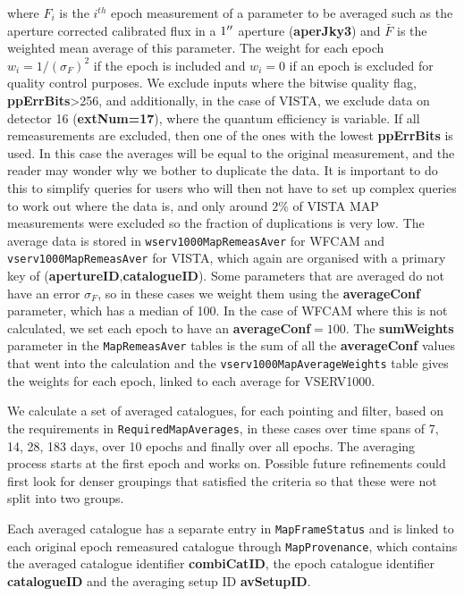 \documentclass[usenatbib]{mnras}
\begin{document}
\noindent where $F_i$ is the $i^{th}$ epoch measurement of a parameter to be
averaged such as the aperture corrected calibrated flux in a $1\hbox{$^{\prime\prime}$}$ aperture
({\bf aperJky3}) and $\bar{F}$ is the weighted mean average of this parameter.
The weight for each epoch $w_i=1/(\sigma_{F})^2$ if the epoch is included and 
$w_i=0$ if an epoch is excluded for quality control purposes. We exclude inputs
where the bitwise quality flag, {\bf ppErrBits}>256, and additionally, in the
case of VISTA, we exclude data on detector 16 ({\bf extNum=17}), where the 
quantum efficiency is variable. If all remeasurements are excluded, then one  of
the ones with the lowest {\bf ppErrBits} is used. In this case the averages 
will be equal to the original measurement, and the reader may wonder why we 
bother to duplicate the data. It is important to do this to simplify queries 
for users who will then not have to set up complex queries to work out where 
the data is, and only around $2\%$ of VISTA MAP measurements were excluded  so
the fraction of duplications is very low. The average data is stored in 
\verb+wserv1000MapRemeasAver+ for WFCAM and \verb+vserv1000MapRemeasAver+ for 
VISTA, which again are organised with a primary key of ({\bf apertureID},{\bf catalogueID}).
Some parameters that are averaged do not have an error $\sigma_{F}$, so in these
cases we weight them using the {\bf averageConf} parameter, which has a median
of 100. In the case of WFCAM where this is not calculated, we set each epoch to
have an {\bf averageConf}$=100$. The {\bf sumWeights} parameter in the
\verb+MapRemeasAver+ tables is the sum of all the {\bf averageConf} values that
went into the calculation and the \verb+vserv1000MapAverageWeights+ table gives
the weights for each epoch, linked to each average for VSERV1000. 

We calculate a set of averaged catalogues, for each pointing and filter, based
on the requirements in \verb+RequiredMapAverages+, in these cases over time
spans of 7, 14, 28, 183 days, over 10 epochs and finally over all epochs. The
averaging process starts at the first epoch and works on. Possible future
refinements could first look for denser groupings that satisfied the criteria so
that these were not split into two groups.

Each averaged catalogue has a separate entry in
\verb+MapFrameStatus+ and is linked to each original epoch remeasured catalogue
through \verb+MapProvenance+, which contains the averaged catalogue
identifier {\bf combiCatID}, the epoch catalogue identifier {\bf catalogueID}
and the averaging setup ID {\bf avSetupID}. 
\end{document}
